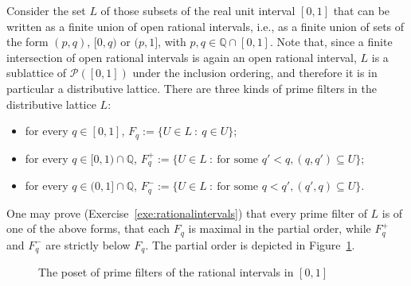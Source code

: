 \begin{example}\label{exa:rationalintervals-primes}
Consider the set $L$ of those subsets of the real unit interval $[0,1]$ that can be written as a finite union of open rational intervals, i.e., as a finite union of sets of the form $(p,q)$, $[0,q)$ or $(p,1]$, with $p, q \in \mathbb{Q} \cap [0,1]$. Note that, since a finite intersection of open rational intervals is again an open rational interval, $L$ is a sublattice of $\mathcal{P}([0,1])$ under the inclusion ordering, and therefore it is in particular a distributive lattice. 
There are three kinds of prime filters in the distributive lattice $L$:
\begin{itemize}
  \item for every $q \in [0,1]$, $F_q := \{U \in L \ \colon \ q \in U\}$;
  \item for every $q \in [0,1) \cap \mathbb{Q}$, $F_q^+ := \{U \in L \ \colon \ \text{for some } q' < q, (q, q') \subseteq U\}$;
  \item for every $q \in (0,1] \cap \mathbb{Q}$, $F_q^- := \{U \in L \ \colon \ \text{for some } q < q', (q', q) \subseteq U\}$.
\end{itemize}
One may prove (Exercise~\ref{exe:rationalintervals}) that every prime filter of $L$ is of one of the above forms, that each $F_q$ is maximal in the partial order, while $F_q^+$ and $F_q^-$ are strictly below $F_q$. The partial order is depicted in Figure~\ref{fig:cherries}.
\begin{figure}
  \begin{center}
  \end{center}
  \caption{The poset of prime filters of the rational intervals in $[0,1]$}
  \label{fig:cherries}
\end{figure}
\end{example}





